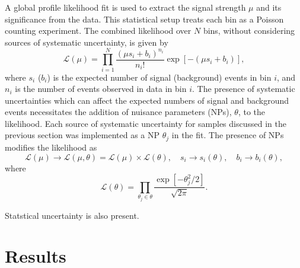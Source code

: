 A global profile likelihood fit is used to extract the signal strength $\mu$ and its significance from the data. This statistical setup treats each bin as a Poisson counting experiment. The combined likelihood over $N$ bins, without considering sources of systematic uncertainty, is given by
%
\begin{equation}
    \mathcal{L}(\mu) = \prod_{i=1}^N \frac{(\mu s_i + b_i)^{n_i}}{n_i!} \exp \left[ - (\mu s_i + b_i) \right],
\end{equation}
%
where $s_i$ ($b_i$) is the expected number of signal (background) events in bin $i$, and $n_i$ is the number of events observed in data in bin $i$. The presence of systematic uncertainties which can affect the expected numbers of signal and background events necessitates the addition of nuisance parameters (NPs), $\theta$, to the likelihood. Each source of systematic uncertainty for \Vjets samples discussed in the previous section was implemented as a NP $\theta_j$ in the fit. The presence of NPs modifies the likelihood as 
%
\begin{equation}
    \mathcal{L}(\mu) \rightarrow \mathcal{L}(\mu, \theta) = \mathcal{L}(\mu) \times \mathcal{L}(\theta) , \quad s_i \rightarrow s_i(\theta) , \quad b_i \rightarrow b_i(\theta),
\end{equation}
%
where
%
\begin{equation}
    \mathcal{L}(\theta) = \prod_{\theta_j \in \theta} \frac{\exp\left[{-\theta_j^2/2}\right]}{\sqrt{2\pi}}.
\end{equation}
%


Statstical uncertainty is also present.

\section{Results}\label{sec:vhbb_results}

